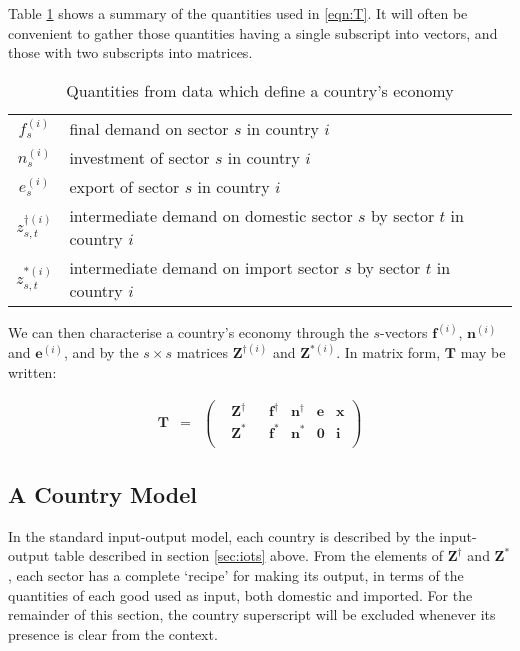 \documentclass[a4paper]{article}
\begin{document}
Table \ref{tbl:cvars} shows a summary of the quantities used in \eqref{eqn:T}. It will often be convenient to gather those quantities having a single subscript into vectors, and those with two subscripts into matrices. 
\begin{table}
\begin{center}
\begin{tabular}{cl}\toprule
$f_s^{(i)}$ & final demand on sector $s$ in country $i$\\
$n_s^{(i)}$ & investment of sector $s$ in country $i$\\
$e_s^{(i)}$ & export of sector $s$ in country $i$\\
$z_{s,t}^{\dagger(i)}$ & intermediate demand on domestic sector $s$ by sector $t$ in country $i$\\
$z_{s,t}^{*(i)}$ & intermediate demand on import sector $s$ by sector $t$ in country $i$\\\bottomrule
\end{tabular}
\end{center}
\caption{Quantities from data which define a country's economy}\label{tbl:cvars}
\end{table}

We can then characterise a country's economy through the $s$-vectors $\boldsymbol{f}^{(i)}$, $\boldsymbol{n}^{(i)}$ and $\boldsymbol{e}^{(i)}$, and by the $s\times s$ matrices $\boldsymbol{Z}^{\dagger(i)}$ and $\boldsymbol{Z}^{*(i)}$.
In matrix form, $\boldsymbol{T}$ may be written:

\begin{equation}\label{eqn:Tvectorised}
\begin{array}{rcc}
\boldsymbol{T} & = & 
\left(
	\begin{array}{ccccccc}
 & \boldsymbol{Z}^{\dag} & & \boldsymbol{f}^\dag & \boldsymbol{n}^\dag & \boldsymbol{e} & \boldsymbol{x} \\
 & \boldsymbol{Z}^* & & \boldsymbol{f}^* & \boldsymbol{n}^* & \boldsymbol{0} & \boldsymbol{i} \\
	\end{array} 
\right)
\end{array}
\end{equation}

\subsection{A Country Model}\label{sec:countries}
In the standard input-output model, each country is described by the input-output table described in section \ref{sec:iots} above.
From the elements of $\boldsymbol{Z}^\dagger$ and $\boldsymbol{Z}^*$, each sector has a complete `recipe' for making its output, in terms of the quantities of each good used as input, both domestic and imported. For the remainder of this section, the country superscript will be excluded whenever its presence is clear from the context.
\end{document}
